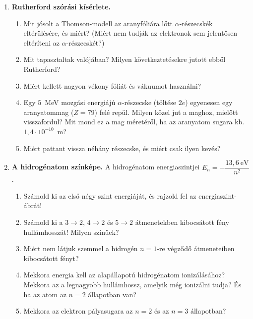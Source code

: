 \documentclass[12pt]{article}
\begin{document}
\newpage
\begin{enumerate}[start=3]
\item \textbf{Rutherford szórási kísérlete.}
  \begin{enumerate}
    \item Mit jósolt a Thomson-modell az aranyfóliára lőtt $\alpha$-részecskék
      eltérülésére, és miért? (Miért nem tudják az elektronok sem jelentősen eltéríteni
      az $\alpha$-részecskét?)
    \item Mit tapasztaltak valójában? Milyen következtetésekre jutott ebből Rutherford?
    \item Miért kellett nagyon vékony fóliát és vákuumot használni?
    \item Egy $5$~MeV mozgási energiájú $\alpha$-részecske (töltése $2e$) egyenesen egy
      aranyatommag ($Z = 79$) felé repül. Milyen közel jut a maghoz, mielőtt
      visszafordul? Mit mond ez a mag méretéről, ha az aranyatom sugara kb.\
      $1{,}4\cdot 10^{-10}$~m?
    \item Miért pattant vissza néhány részecske, és miért csak ilyen kevés?
  \end{enumerate}

\item \textbf{A hidrogénatom színképe.} A hidrogénatom energiaszintjei
  $E_n = -\dfrac{13{,}6~\text{eV}}{n^2}$.
  \begin{enumerate}
    \item Számold ki az első négy szint energiáját, és rajzold fel az energiaszint-ábrát!
    \item Számold ki a $3\to2$, $4\to2$ és $5\to2$ átmenetekben kibocsátott fény
      hullámhosszát! Milyen színűek?
    \item Miért nem látjuk szemmel a hidrogén $n=1$-re végződő átmeneteiben kibocsátott
      fényt?
    \item Mekkora energia kell az alapállapotú hidrogénatom ionizálásához? Mekkora az a
      legnagyobb hullámhossz, amelyik még ionizálni tudja? És ha az atom az $n=2$
      állapotban van?
    \item Mekkora az elektron pályasugara az $n=2$ és az $n=3$ állapotban?
  \end{enumerate}
\end{enumerate}
\end{document}
